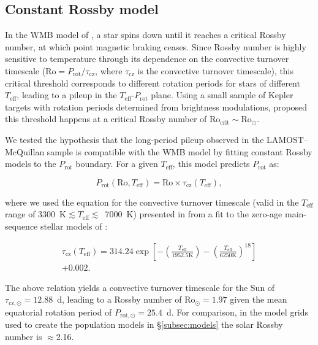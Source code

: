 \documentclass[trackchanges,twocolumn]{aastex631}
\newcommand{\lamostmcq}{LAMOST--McQuillan\xspace}
\newcommand{\teff}{\ensuremath{T_{\mathrm{eff}}}\xspace}
\newcommand{\prot}{\ensuremath{P_\mathrm{rot}}\xspace}
\begin{document}
\subsection{Constant Rossby model}
\label{subsec:rossby}
In the WMB model of \citet{vanSaders2016, vanSaders2019}, a star spins down until it reaches a critical Rossby number, at which point magnetic braking ceases. Since Rossby number is highly sensitive to temperature through its dependence on the convective turnover timescale ($\mathrm{Ro} = P_\mathrm{rot}/\tau_\mathrm{cz}$, where $\tau_\mathrm{cz}$ is the convective turnover timescale), this critical threshold corresponds to different rotation periods for stars of different \teff, leading to a pileup in the \teff-\prot plane. Using a small sample of Kepler targets with rotation periods determined from brightness modulations, \citet{vanSaders2016} proposed this threshold happens at a critical Rossby number of $\mathrm{Ro_{crit}} \sim \mathrm{Ro_\odot}$. 

We tested the hypothesis that the long-period pileup observed in the \lamostmcq sample is compatible with the WMB model by fitting constant Rossby models to the \prot boundary. For a given \teff, this model predicts \prot as: 

\begin{equation} \label{eq:1}
    \prot (\mathrm{Ro}, \teff) = \mathrm{Ro} \times \tau_\mathrm{cz}(\teff),
\end{equation}

where we used the equation for the convective turnover timescale (valid in the \teff range of 3300~K$\lesssim \teff \lesssim$~7000~K) presented in \citet{CranmerSaar2011} from a fit to the zero-age main-sequence stellar models of \citet{Gunn1998}:

\begin{multline} \label{eq:2}
\tau_\mathrm{cz}(\teff) = 314.24\exp \left [ -\left (\frac{T_\mathrm{eff}}{1952.5 \mathrm{K}}  \right ) - \left (\frac{T_\mathrm{eff}}{6250 \mathrm{K}}  \right )^{18} \right ] \\+ 0.002.
\end{multline}

The above relation yields a convective turnover timescale for the Sun of $\tau_\mathrm{cz,\odot} = 12.88$~d, leading to a Rossby number of $\mathrm{Ro_\odot}=1.97$ given the mean equatorial rotation period of $P_\mathrm{rot,\odot} = 25.4$~d. For comparison, in the model grids used to create the population models in \S\ref{subsec:models} the solar Rossby number is $\approx$2.16.
\end{document}
